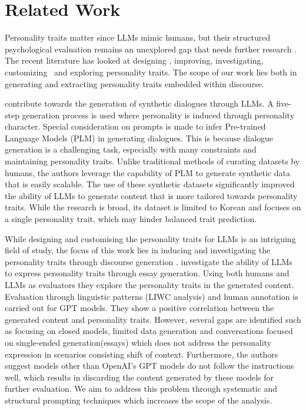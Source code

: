 \section{Related Work}
Personality traits matter since LLMs mimic humans, but their structured psychological evaluation remains an unexplored gap that needs further research \cite{zhu2025investigating}.
The recent literature has looked at designing \cite{klinkert2024evaluating}, improving\cite{huang2024designing}, investigating\cite{frisch-giulianelli-2024-llm,zhu2025investigating}, customizing~\cite{han2024psydial,dan2024ptailor,zhang-etal-2018-personalizing} and exploring \cite{zhu2025investigating,han2024psydial} personality traits. The scope of our work lies both in generating and extracting personality traits embedded within discourse. 



\citet{han2024psydial} contribute towards the generation of synthetic dialogues through LLMs. A five-step generation process is used where personality is induced through personality character. Special consideration on prompts is made to infer Pre-trained Language Models (PLM) in generating dialogues. This is because dialogue generation is a challenging task, especially with many constraints and maintaining personality traits. Unlike traditional methods of curating datasets by humans, the authors leverage the capability of PLM to generate synthetic data that is easily scalable. The use of these synthetic datasets significantly improved the ability of LLMs to generate content that is more tailored towards personality traits. While the research is broad, its dataset is limited to Korean and focuses on a single personality trait, which may hinder balanced trait prediction.

While designing and customising the personality traits for LLMs is an intriguing field of study, the focus of this work lies in inducing and investigating the personality traits through discourse generation \cite{yeo-etal-2025-pado}. \citet{jiang2023personallm} investigate the ability of LLMs to express personality traits through essay generation. Using both humans and LLMs as evaluators they explore the personality traits in the generated content. Evaluation through linguistic patterns (LIWC analysis) and human annotation is carried out for GPT models. They show a positive correlation between the generated content and personality traits. However, several gaps are identified such as focusing on closed models, limited data generation and conversations focused on single-ended generation(essays) which does not address the personality expression in scenarios consisting shift of context. Furthermore, the authors suggest models other than OpenAI's GPT models do not follow the instructions well, which results in discarding the content generated by these models for further evaluation. We aim to address this problem through systematic and structural prompting techniques which increases the scope of the analysis. 



